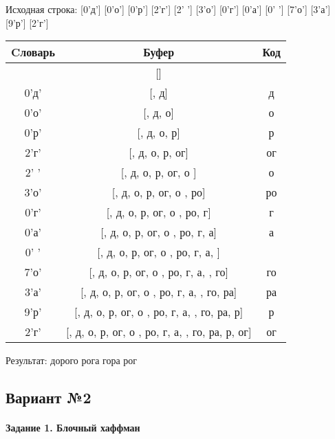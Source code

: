 \documentclass[a4paper, 12pt]{article}
\begin{document}
Исходная строка: [0'д'] [0'о'] [0'р'] [2'г'] [2' '] [3'о'] [0'г'] [0'а'] [0' '] [7'о'] [3'а'] [9'р'] [2'г']\\
\begin{table}[h!]
\centering
\begin{tabular}{|c|c|c|}
\hline
 Cловарь & Буфер & Код  \\ \hline
 & [] & 
\\ \hline
0'д' & [, д] & д
\\ \hline
0'о' & [, д, о] & о
\\ \hline
0'р' & [, д, о, р] & р
\\ \hline
2'г' & [, д, о, р, ог] & ог
\\ \hline
2' ' & [, д, о, р, ог, о ] & о 
\\ \hline
3'о' & [, д, о, р, ог, о , ро] & ро
\\ \hline
0'г' & [, д, о, р, ог, о , ро, г] & г
\\ \hline
0'а' & [, д, о, р, ог, о , ро, г, а] & а
\\ \hline
0' ' & [, д, о, р, ог, о , ро, г, а,  ] &  
\\ \hline
7'о' & [, д, о, р, ог, о , ро, г, а,  , го] & го
\\ \hline
3'а' & [, д, о, р, ог, о , ро, г, а,  , го, ра] & ра
\\ \hline
9'р' & [, д, о, р, ог, о , ро, г, а,  , го, ра,  р] &  р
\\ \hline
2'г' & [, д, о, р, ог, о , ро, г, а,  , го, ра,  р, ог] & ог
\\ \hline
\end{tabular}
\end{table}

Результат: дорого рога гора рог
\pagebreak
\subsection{Вариант №2}
\paragraph{Задание 1. Блочный хаффман \\}
\end{document}
